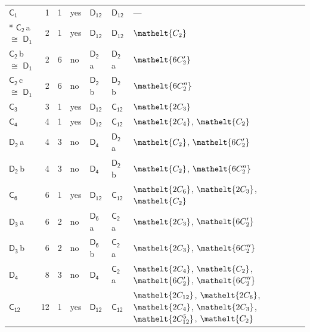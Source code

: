 \documentclass[10pt,a4paper]{article}
\numberwithin{equation}{section}
\newcommand{\eltfont}[1]{{\let\sigma\eltsigma\mathelt{#1}}}
\newcommand{\grp}[1]{\mathsf{#1}}
\newcommand{\cls}[1]{\eltfont{#1}}
\newcommand{\samecls}{\cong}
\newcommand{\clsletter}[1]{\,{\scriptsize\color{black!55}#1}}
\newlength{\fillwidth}\newlength{\cellwidth}\newlength{\colwidth}
\begin{document}
{\begin{longtable}{@{}lrrlll>{\RaggedRight\arraybackslash}p{\fillwidth}@{}}
\bottomrule\endfoot\endlastfoot
\href{C1.pdf}{$\grp{C_{1}}$} & 1 & 1 & yes & \href{D12.pdf}{$\grp{D_{12}}$} & \href{D12.pdf}{$\grp{D_{12}}$} & ---\\*
\href{C2.pdf}{$\grp{C_{2}}$}\clsletter{a} $\samecls$ \href{D1.pdf}{$\grp{D_{1}}$} & 2 & 1 & yes & \href{D12.pdf}{$\grp{D_{12}}$} & \href{D12.pdf}{$\grp{D_{12}}$} & $\cls{C_{2}}$\\
\href{C2.pdf}{$\grp{C_{2}}$}\clsletter{b} $\samecls$ \href{D1.pdf}{$\grp{D_{1}}$} & 2 & 6 & no & \href{D2.pdf}{$\grp{D_{2}}$}\clsletter{a} & \href{D2.pdf}{$\grp{D_{2}}$}\clsletter{a} & $\cls{6C_{2}'}$\\
\href{C2.pdf}{$\grp{C_{2}}$}\clsletter{c} $\samecls$ \href{D1.pdf}{$\grp{D_{1}}$} & 2 & 6 & no & \href{D2.pdf}{$\grp{D_{2}}$}\clsletter{b} & \href{D2.pdf}{$\grp{D_{2}}$}\clsletter{b} & $\cls{6C_{2}''}$\\
\href{C3.pdf}{$\grp{C_{3}}$} & 3 & 1 & yes & \href{D12.pdf}{$\grp{D_{12}}$} & \href{C12.pdf}{$\grp{C_{12}}$} & $\cls{2C_{3}}$\\
\href{C4.pdf}{$\grp{C_{4}}$} & 4 & 1 & yes & \href{D12.pdf}{$\grp{D_{12}}$} & \href{C12.pdf}{$\grp{C_{12}}$} & $\cls{2C_{4}}$, $\cls{C_{2}}$\\
\href{D2.pdf}{$\grp{D_{2}}$}\clsletter{a} & 4 & 3 & no & \href{D4.pdf}{$\grp{D_{4}}$} & \href{D2.pdf}{$\grp{D_{2}}$}\clsletter{a} & $\cls{C_{2}}$, $\cls{6C_{2}'}$\\
\href{D2.pdf}{$\grp{D_{2}}$}\clsletter{b} & 4 & 3 & no & \href{D4.pdf}{$\grp{D_{4}}$} & \href{D2.pdf}{$\grp{D_{2}}$}\clsletter{b} & $\cls{C_{2}}$, $\cls{6C_{2}''}$\\
\href{C6.pdf}{$\grp{C_{6}}$} & 6 & 1 & yes & \href{D12.pdf}{$\grp{D_{12}}$} & \href{C12.pdf}{$\grp{C_{12}}$} & $\cls{2C_{6}}$, $\cls{2C_{3}}$, $\cls{C_{2}}$\\
\href{D3.pdf}{$\grp{D_{3}}$}\clsletter{a} & 6 & 2 & no & \href{D6.pdf}{$\grp{D_{6}}$}\clsletter{a} & \href{C2.pdf}{$\grp{C_{2}}$}\clsletter{a} & $\cls{2C_{3}}$, $\cls{6C_{2}'}$\\
\href{D3.pdf}{$\grp{D_{3}}$}\clsletter{b} & 6 & 2 & no & \href{D6.pdf}{$\grp{D_{6}}$}\clsletter{b} & \href{C2.pdf}{$\grp{C_{2}}$}\clsletter{a} & $\cls{2C_{3}}$, $\cls{6C_{2}''}$\\
\href{D4.pdf}{$\grp{D_{4}}$} & 8 & 3 & no & \href{D4.pdf}{$\grp{D_{4}}$} & \href{C2.pdf}{$\grp{C_{2}}$}\clsletter{a} & $\cls{2C_{4}}$, $\cls{C_{2}}$, $\cls{6C_{2}'}$, $\cls{6C_{2}''}$\\
\href{C12.pdf}{$\grp{C_{12}}$} & 12 & 1 & yes & \href{D12.pdf}{$\grp{D_{12}}$} & \href{C12.pdf}{$\grp{C_{12}}$} & $\cls{2C_{12}}$, $\cls{2C_{6}}$, $\cls{2C_{4}}$, $\cls{2C_{3}}$, $\cls{2C_{12}^{5}}$, $\cls{C_{2}}$\\

\end{longtable}}
\end{document}
